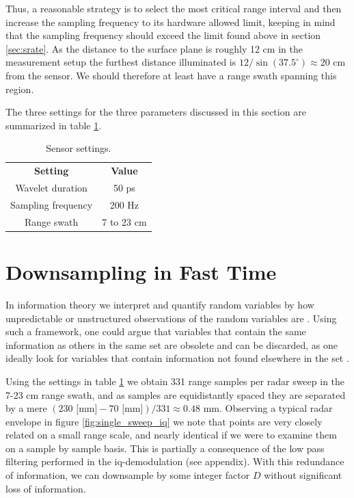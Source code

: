 Thus, a reasonable strategy is to select the most critical range interval and then increase the sampling frequency to its hardware allowed limit, keeping in mind that the sampling frequency should exceed the limit found above in section \ref{sec:srate}. As the distance to the surface plane is roughly 12 cm in the measurement setup the furthest distance illuminated is $12/\sin(37.5^\circ)\approx 20$ cm from the sensor. We should therefore at least have a range swath spanning this region. 

The three settings for the three parameters discussed in this section are summarized in table \ref{tab:sensor_settings}.

\begin{table}
\begin{center}
	\begin{tabular}{|c|c|}
	  	\hline
	  	\cellcolor{gray!150}\color{white}\textbf{Setting} & \cellcolor{gray!150}\color{white}\textbf{Value} \\
	 	 Wavelet duration & 50 ps \\
	  	\cellcolor{gray!25}Sampling frequency & \cellcolor{gray!25}200 Hz \\
	  	Range swath & 7 to 23 cm \\ 
		\hline
  	\end{tabular}	
\end{center}
\caption{Sensor settings.}
\label{tab:sensor_settings}
\end{table}

\section{Downsampling in Fast Time}
\label{downsampling}

In information theory we interpret and quantify random variables by how unpredictable or unstructured observations of the random variables are \citep{anderson_johnnesson_2006}. Using such a framework, one could argue that variables that contain the same information as others in the same set are obsolete and can be discarded, as one ideally look for variables that contain information not found elsewhere in the set \citep{hyvasrinen_karhunen_oja_2004}.

Using the settings in table \ref{tab:sensor_settings} we obtain 331 range samples per radar sweep in the 7-23 cm range swath, and as samples are equidistantly spaced they are separated by a mere $(230 \text{ [mm]}-70\text{ [mm]})/331\approx0.48$ mm. Observing a typical radar envelope in figure \ref{fig:single_sweep_iq} we note that points are very closely related on a small range scale, and nearly identical if we were to examine them on a sample by sample basis. This is partially a consequence of the low pass filtering performed in the \gls{iq}-demodulation (see appendix). With this redundance of information, we can downsample by some integer factor $D$ without significant loss of information.

